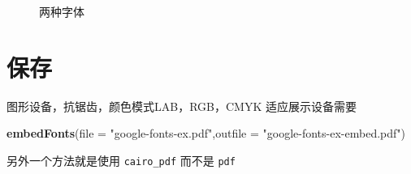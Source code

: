\documentclass[a4paper,oneside,UTF8]{book}
\newenvironment{Shaded}{\begin{snugshade}}{\end{snugshade}}
\newcommand{\DataTypeTok}[1]{\textcolor[rgb]{0.13,0.29,0.53}{#1}}
\newcommand{\KeywordTok}[1]{\textcolor[rgb]{0.13,0.29,0.53}{\textbf{#1}}}
\newcommand{\NormalTok}[1]{#1}
\newcommand{\StringTok}[1]{\textcolor[rgb]{0.31,0.60,0.02}{#1}}
\begin{document}
\begin{figure}

{\centering {}

}

\caption{两种字体}\label{fig:Alegreya-Sans}
\end{figure}

\hypertarget{save-plots}{%
\section{保存}\label{save-plots}}

图形设备，抗锯齿，颜色模式LAB，RGB，CMYK 适应展示设备需要

\begin{Shaded}
\begin{Highlighting}[]
\KeywordTok{embedFonts}\NormalTok{(}\DataTypeTok{file =} \StringTok{"google-fonts-ex.pdf"}\NormalTok{,}\DataTypeTok{outfile =} \StringTok{"google-fonts-ex-embed.pdf"}\NormalTok{)}
\end{Highlighting}
\end{Shaded}

另外一个方法就是使用 \texttt{cairo\_pdf} 而不是 \texttt{pdf}

\cleardoublepage

\hypertarget{appendix}{%
\appendix {}}




\backmatter
\printindex
\end{document}
